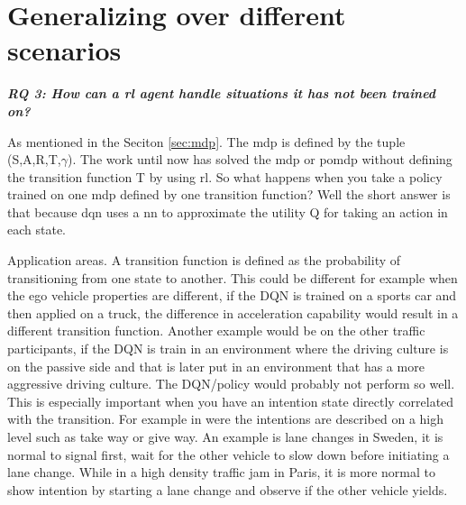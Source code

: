 \chapter{Generalizing over different scenarios} \label{ch:generalize}
\begin{center}
  \textit{\textbf{RQ 3: How can a \gls{rl} agent handle situations it has not been trained on?}}
  \end{center}
  \vspace{12pt}

As mentioned in the Seciton \ref{sec:mdp}. The \gls{mdp} is defined by the tuple (S,A,R,T,$\gamma$). The work until now has solved the \gls{mdp} or \gls{pomdp} without defining the transition function T by using \gls{rl}. So what happens when you take a policy trained on one \gls{mdp} defined by one transition function? Well the short answer is that because \gls{dqn} uses a \gls{nn} to approximate the utility Q for taking an action in each state. 

Application areas. A transition function is defined as the probability of transitioning from one state to another. This could be different for example when the ego vehicle properties are different, if the DQN is trained on a sports car and then applied on a truck, the difference in acceleration capability would result in a different transition function. Another example would be on the other traffic participants, if the DQN is train in an environment where the driving culture is on the passive side and that is later put in an environment that has a more aggressive driving culture. The DQN/policy would probably not perform so well. 
This is especially important when you have an intention state directly correlated with the transition. For example in \paperD were the intentions are described on a high level such as take way or give way. 
An example is lane changes in Sweden, it is normal to signal first, wait for the other vehicle to slow down before initiating a lane change. While in a high density traffic jam in Paris, it is more normal to show intention by starting a lane change and observe if the other vehicle yields. 

